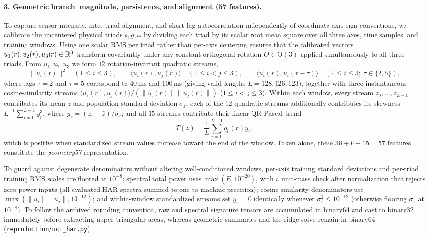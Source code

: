 \paragraph{3. Geometric branch: magnitude, persistence, and alignment (57 features).}
To capture sensor intensity, inter-triad alignment, and short-lag autocorrelation
independently of coordinate-axis sign conventions, we calibrate the uncentered
physical triads \(b, g, \omega\) by dividing each triad by its scalar root mean
square over all three axes, time samples, and training windows. Using one scalar
RMS per triad rather than per-axis centering ensures that the calibrated vectors
\(u_1(r), u_2(r), u_3(r) \in \mathbb{R}^3\) transform covariantly under any constant
orthogonal rotation \(O \in \mathrm{O}(3)\) applied simultaneously to all three
triads. From \(u_1, u_2, u_3\) we form \(12\) rotation-invariant quadratic
streams,
\[
 \|u_i(r)\|^2 \quad (1 \leq i \leq 3), \qquad
 \langle u_i(r), u_j(r)\rangle \quad (1 \leq i < j \leq 3), \qquad
 \langle u_i(r), u_i(r - \tau)\rangle \quad (1 \leq i \leq 3;\ \tau \in \{2, 5\}),
\]
where lags \(\tau = 2\) and \(\tau = 5\) correspond to \(40\,\mathrm{ms}\) and
\(100\,\mathrm{ms}\) (giving valid lengths \(L = 128, 126, 123\)), together with
three instantaneous cosine-similarity streams
\(\langle u_i(r), u_j(r)\rangle / (\|u_i(r)\|\|u_j(r)\|)\) (\(1 \leq i < j \leq 3\)).
Within each window, every stream \(z_0, \ldots, z_{L-1}\) contributes its mean
\(\bar z\) and population standard deviation \(\sigma_z\); each of the \(12\)
quadratic streams additionally contributes its skewness
\(L^{-1}\sum_{r=0}^{L-1} y_r^3\), where \(y_r = (z_r - \bar z)/\sigma_z\); and all
\(15\) streams contribute their linear QR-Pascal trend
\[
 T(z) = \frac{1}{L}\sum_{r=0}^{L-1} q_1(r) y_r,
\]
which is positive when standardized stream values increase toward the end of the
window. Taken alone, these \(36 + 6 + 15 = 57\) features constitute the
\emph{geometry57} representation.

\begin{remark}
To guard against degenerate denominators without altering well-conditioned
windows, per-axis training standard deviations and per-triad training RMS scales
are floored at \(10^{-8}\); spectral total power uses \(\max(E, 10^{-20})\),
with a unit-mass check after normalization that rejects zero-power inputs
(all evaluated HAR spectra summed to one to machine precision);
cosine-similarity denominators use \(\max(\|u_i\|\|u_j\|, 10^{-12})\);
and within-window standardized streams set \(y_r = 0\) identically whenever
\(\sigma_z^2 \leq 10^{-12}\) (otherwise flooring \(\sigma_z\) at \(10^{-8}\)). To
follow the archived rounding convention, raw and spectral signature tensors
are accumulated in binary64 and cast to binary32 immediately before extracting
upper-triangular areas, whereas geometric summaries and the ridge solve remain in
binary64 (\nolinkurl{reproduction/uci_har.py}).
\end{remark}

